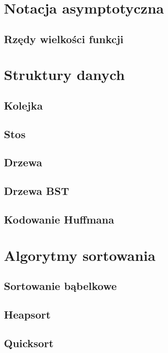 \documentclass[10pt, oneside]{article}
\theoremstyle{remark}
\begin{document}
\section{Notacja asymptotyczna}



\subsection{Rzędy wielkości funkcji}


\section{Struktury danych}
\subsection{Kolejka}

\subsection{Stos}

\subsection{Drzewa}

\subsection{Drzewa BST}

\subsection{Kodowanie Huffmana}


\section{Algorytmy sortowania}

\subsection{Sortowanie bąbelkowe}

\subsection{Heapsort}

\subsection{Quicksort}
\end{document}
